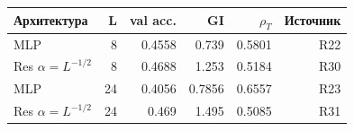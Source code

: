 \begin{tabular}{lrrrrr}
\toprule
Архитектура & L & val acc. & GI & $\rho_T$ & Источник \\
\midrule
MLP & 8 & 0.4558 & 0.739 & 0.5801 & R22 \\
Res $\alpha=L^{-1/2}$ & 8 & 0.4688 & 1.253 & 0.5184 & R30 \\
MLP & 24 & 0.4056 & 0.7856 & 0.6557 & R23 \\
Res $\alpha=L^{-1/2}$ & 24 & 0.469 & 1.495 & 0.5085 & R31 \\
\bottomrule
\end{tabular}